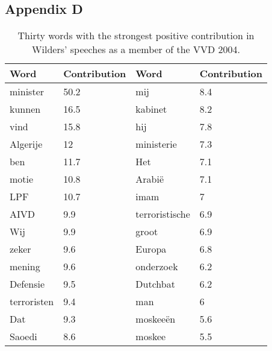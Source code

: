 \subsection*{Appendix D}
\begin{table}[ht!]
\begin{tabular}{|l|l|l|l|}
\hline
Word        & Contribution & Word           & Contribution \\ \hline
minister    & 50.2         & mij            & 8.4          \\ \hline
kunnen      & 16.5         & kabinet        & 8.2          \\ \hline
vind        & 15.8         & hij            & 7.8          \\ \hline
Algerije    & 12           & ministerie     & 7.3          \\ \hline
ben         & 11.7         & Het            & 7.1          \\ \hline
motie       & 10.8         & Arabië         & 7.1          \\ \hline
LPF         & 10.7         & imam           & 7            \\ \hline
AIVD        & 9.9          & terroristische & 6.9          \\ \hline
Wij         & 9.9          & groot          & 6.9          \\ \hline
zeker       & 9.6          & Europa         & 6.8          \\ \hline
mening      & 9.6          & onderzoek      & 6.2          \\ \hline
Defensie    & 9.5          & Dutchbat       & 6.2          \\ \hline
terroristen & 9.4          & man            & 6            \\ \hline
Dat         & 9.3          & moskeeën       & 5.6          \\ \hline
Saoedi      & 8.6          & moskee         & 5.5          \\ \hline
\end{tabular}
\caption{Thirty words with the strongest positive contribution in Wilders' speeches as a member of the VVD 2004.}
\label{tab:wilders}
\end{table}